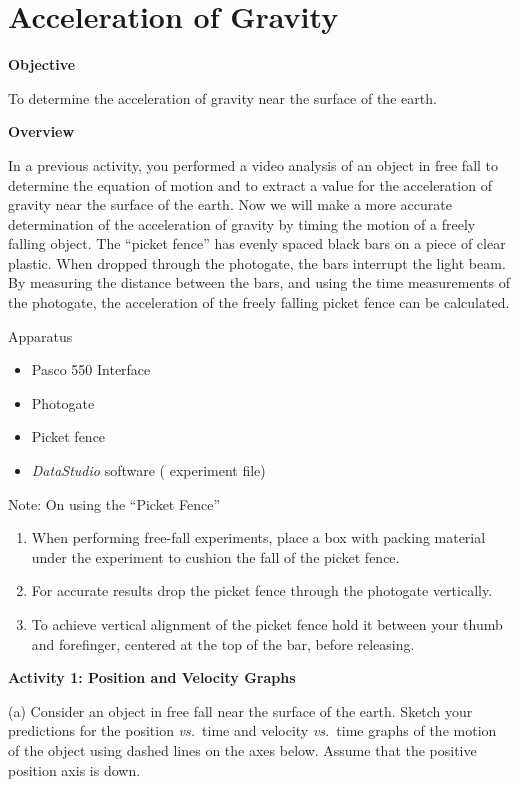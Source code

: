 
\section{Acceleration of Gravity}

\makelabheader %

\textbf{Objective} 

To determine the acceleration of gravity near the surface of the earth.

\textbf{Overview }

In a previous activity, you performed a video analysis of an object in free
fall to determine the equation of motion and to extract a value for the acceleration
of gravity near the surface of the earth. Now we will make a more accurate determination
of the acceleration of gravity by timing the motion of a freely falling object.
The ``picket fence'' has evenly spaced black bars on a piece
of clear plastic. When dropped through the photogate, the bars interrupt the
light beam. By measuring the distance between the bars, and using the time measurements
of the photogate, the acceleration of the freely falling picket fence can be
calculated. 

Apparatus 

\begin{itemize}
\item Pasco 550 Interface
\item Photogate 
\item Picket fence 
\item \textit{DataStudio} software ( experiment file)
\end{itemize}
Note: On using the ``Picket Fence''

\begin{enumerate}
\item When performing free-fall experiments, place a box with packing material under
the experiment to cushion the fall of the picket fence.
\item For accurate results drop the picket fence through the photogate vertically.
\item To achieve vertical alignment of the picket fence hold it between your thumb
and forefinger, centered at the top of the bar, before releasing.
\end{enumerate}
\textbf{Activity 1: Position and Velocity Graphs}

(a) Consider an object in free fall near the surface of the earth. Sketch your
predictions for the position \textit{vs.}~time and velocity \textit{vs.}~time graphs of the motion
of the object using dashed lines on the axes below. Assume that the positive
position axis is down.

